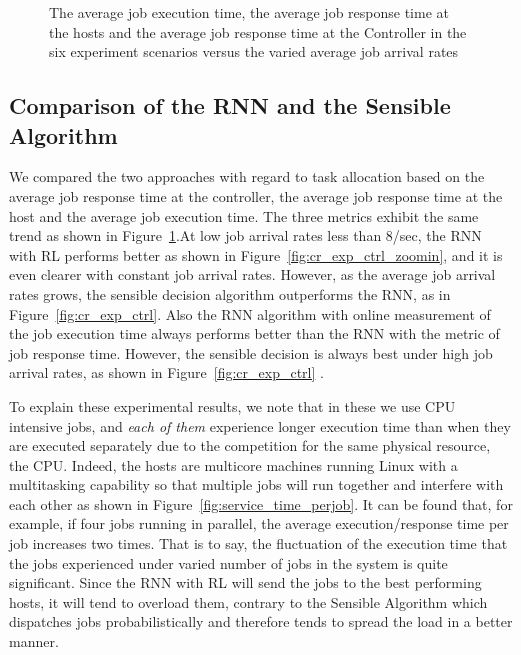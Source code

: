 \documentclass[journal]{IEEEtran}
\begin{document}
		\begin{figure}[ht]
     \centering
       
			\caption{The average job execution time, the average job response time at the hosts and the average job response time at the Controller in the six experiment scenarios versus the varied average job arrival rates }
			\label{fig:cr_exp}
     \end{figure}
		
		
	

\subsection{Comparison of the RNN and the Sensible Algorithm}
\label{performanceevaluationofrnnsensible}

We compared the two approaches with regard to task allocation based on the average job response time at the controller, the average job response time at the host and the average job execution time. The three metrics exhibit the same trend as shown in Figure~\ref{fig:cr_exp}.At low job arrival rates less than $8$/sec, the RNN with RL performs better as shown in Figure~\ref{fig:cr_exp_ctrl_zoomin}, and it is even  clearer with constant job arrival rates. 
However, as the average job arrival rates grows, the sensible decision algorithm outperforms the RNN, as in Figure~\ref{fig:cr_exp_ctrl}. Also the RNN algorithm with online measurement of the job execution time always performs better than the RNN with the metric of job response time. However, the sensible decision is always best under high job arrival rates, as shown in Figure~\ref{fig:cr_exp_ctrl} .



To explain these experimental results, we note that in these  we use CPU intensive jobs, and  {\em each of them} experience longer execution time than when they are executed separately due to the competition for the same physical resource, the CPU. Indeed, the hosts are multicore machines running Linux  with a multitasking capability so that multiple jobs will run together and interfere with each other 
as shown in Figure~\ref{fig:service_time_perjob}. It can be found that, for example, if four jobs running in parallel, the average execution/response time per job increases two times. That is to say, the fluctuation of the execution time that the jobs experienced under varied number of jobs in the system is quite significant. Since the RNN with RL will send the jobs to the best performing hosts, it will tend to overload them, contrary to the Sensible Algorithm which dispatches jobs probabilistically and therefore tends to spread the load in a better manner. 
\end{document}
